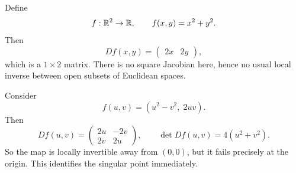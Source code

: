 \begin{example}
Define
\[
f:\mathbb{R}^2\to\mathbb{R},\qquad f(x,y)=x^2+y^2.
\]
Then
\[
Df(x,y)=\begin{pmatrix}2x & 2y\end{pmatrix},
\]
which is a \(1\times 2\) matrix. There is no square Jacobian here, hence no usual local inverse between open subsets of Euclidean spaces.
\end{example}

\begin{example}
Consider
\[
f(u,v)=(u^2-v^2,\;2uv).
\]
Then
\[
Df(u,v)=
\begin{pmatrix}
2u & -2v\\
2v & 2u
\end{pmatrix},
\qquad \det Df(u,v)=4(u^2+v^2).
\]
So the map is locally invertible away from \((0,0)\), but it fails precisely at the origin. This identifies the singular point immediately.
\end{example}

